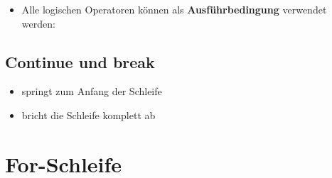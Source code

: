 \begin{frame}
    \slidehead
    \begin{itemize}
        \item Alle logischen Operatoren können als \textbf{Ausführbedingung} verwendet werden:
    \end{itemize}
\end{frame}

\livecoding

\subsection{Continue und break}
\begin{frame}
    \slidehead

    \begin{itemize}
        \item {} springt zum Anfang der Schleife
        \item {} bricht die Schleife komplett ab
    \end{itemize}
\end{frame}

\livecoding


\section{For-Schleife}
\subtitle{Kapitel 4: Befehle wiederholen}


